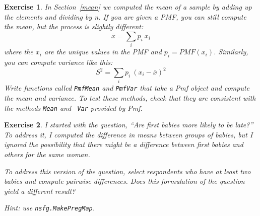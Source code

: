\documentclass[12pt]{book}
\newcommand{\xbar}{\bar{x}}
\theoremstyle{exercise}
\newtheorem{exercise}{Exercise}[chapter]
\begin{document}
\begin{exercise}%
%
%

In Section~\ref{mean} we computed the mean of a sample by adding up
the elements and dividing by n.  If you are given a PMF, you can
still compute the mean, but the process is slightly different:
%
\[ \xbar = \sum_i p_i~x_i \]
%
where the $x_i$ are the unique values in the PMF and $p_i=PMF(x_i)$.
Similarly, you can compute variance like this:
%
\[ S^2 = \sum_i p_i~(x_i - \xbar)^2\]
% 
Write functions called {\tt PmfMean} and {\tt PmfVar} that take a
Pmf object and compute the mean and variance.  To test these methods,
check that they are consistent with the methods {\tt Mean} and {\tt
  Var} provided by Pmf.%

\end{exercise}


\begin{exercise}
I started with the question, ``Are first babies more likely
to be late?''  To address it, I computed the difference in
means between groups of babies, but I ignored the possibility
that there might be a difference between first babies and
others {\em for the same woman}.

To address this version of the question, select respondents who
have at least two babies and compute pairwise differences.  Does
this formulation of the question yield a different result?

Hint: use {\tt nsfg.MakePregMap}.
\end{exercise}
\end{document}
